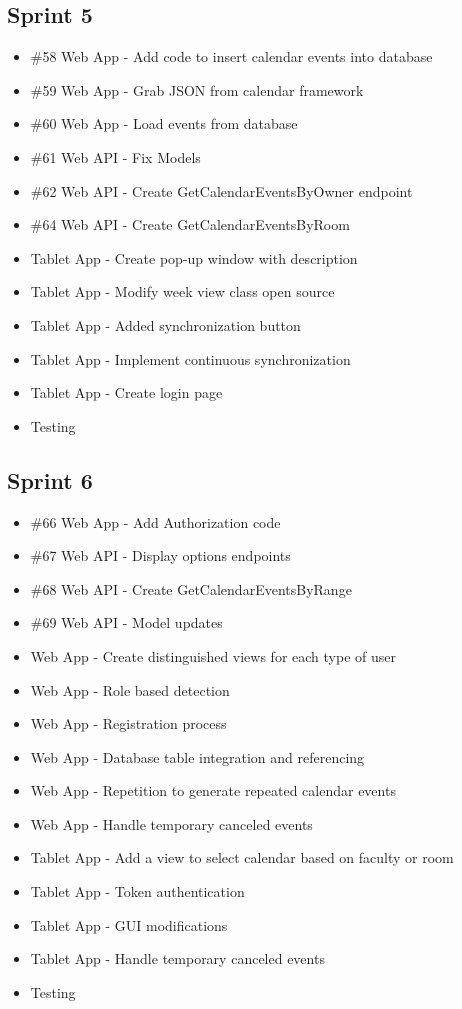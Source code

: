 \subsection*{Sprint 5}
\begin{itemize}
\item \#58 Web App - Add code to insert calendar events into database
\item \#59 Web App - Grab JSON from calendar framework
\item \#60 Web App - Load events from database
\item \#61 Web API - Fix Models
\item \#62 Web API - Create GetCalendarEventsByOwner endpoint
\item \#64 Web API - Create GetCalendarEventsByRoom
\item Tablet App - Create pop-up window with description
\item Tablet App - Modify week view class open source
\item Tablet App - Added synchronization button
\item Tablet App - Implement continuous synchronization
\item Tablet App - Create login page
\item Testing
\end{itemize}

\subsection*{Sprint 6}
\begin{itemize}
\item \#66 Web App - Add Authorization code
\item \#67 Web API - Display options endpoints
\item \#68 Web API - Create GetCalendarEventsByRange
\item \#69 Web API - Model updates
\item Web App - Create distinguished views for each type of user
\item Web App - Role based detection
\item Web App - Registration process
\item Web App - Database table integration and referencing
\item Web App - Repetition to generate repeated calendar events
\item Web App - Handle temporary canceled events
\item Tablet App - Add a view to select calendar based on faculty or room
\item Tablet App - Token authentication
\item Tablet App - GUI modifications
\item Tablet App - Handle temporary canceled events
\item Testing
\end{itemize}

